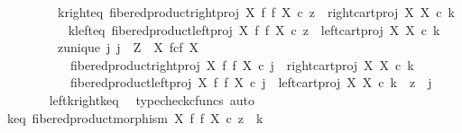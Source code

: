 \begin{isabellebody}
\ \ \ \ \ \ \ \ \ k{\isacharunderscore}{\kern0pt}right{\isacharunderscore}{\kern0pt}eq{\isacharcolon}{\kern0pt}\ {\isachardoublequoteopen}fibered{\isacharunderscore}{\kern0pt}product{\isacharunderscore}{\kern0pt}right{\isacharunderscore}{\kern0pt}proj\ X\ f\ f\ X\ {\isasymcirc}\isactrlsub c\ z\ {\isacharequal}{\kern0pt}\ right{\isacharunderscore}{\kern0pt}cart{\isacharunderscore}{\kern0pt}proj\ X\ X\ {\isasymcirc}\isactrlsub c\ k{\isachardoublequoteclose}\ \isanewline
\ \ \ \ \ \ \ \ \ k{\isacharunderscore}{\kern0pt}left{\isacharunderscore}{\kern0pt}eq{\isacharcolon}{\kern0pt}\ {\isachardoublequoteopen}fibered{\isacharunderscore}{\kern0pt}product{\isacharunderscore}{\kern0pt}left{\isacharunderscore}{\kern0pt}proj\ X\ f\ f\ X\ {\isasymcirc}\isactrlsub c\ z\ {\isacharequal}{\kern0pt}\ left{\isacharunderscore}{\kern0pt}cart{\isacharunderscore}{\kern0pt}proj\ X\ X\ {\isasymcirc}\isactrlsub c\ k{\isachardoublequoteclose}\isanewline
\ \ \ \ \ \ \ \ \ z{\isacharunderscore}{\kern0pt}unique{\isacharcolon}{\kern0pt}\ {\isachardoublequoteopen}{\isasymAnd}j{\isachardot}{\kern0pt}\ j\ {\isacharcolon}{\kern0pt}\ Z\ {\isasymrightarrow}\ X\ \isactrlbsub f\isactrlesub {\isasymtimes}\isactrlsub c\isactrlbsub f\isactrlesub \ X\ \isanewline
\ \ \ \ \ \ \ \ \ \ {\isasymand}\ fibered{\isacharunderscore}{\kern0pt}product{\isacharunderscore}{\kern0pt}right{\isacharunderscore}{\kern0pt}proj\ X\ f\ f\ X\ {\isasymcirc}\isactrlsub c\ j\ {\isacharequal}{\kern0pt}\ right{\isacharunderscore}{\kern0pt}cart{\isacharunderscore}{\kern0pt}proj\ X\ X\ {\isasymcirc}\isactrlsub c\ k\isanewline
\ \ \ \ \ \ \ \ \ \ {\isasymand}\ fibered{\isacharunderscore}{\kern0pt}product{\isacharunderscore}{\kern0pt}left{\isacharunderscore}{\kern0pt}proj\ X\ f\ f\ X\ {\isasymcirc}\isactrlsub c\ j\ {\isacharequal}{\kern0pt}\ left{\isacharunderscore}{\kern0pt}cart{\isacharunderscore}{\kern0pt}proj\ X\ X\ {\isasymcirc}\isactrlsub c\ k\ {\isasymLongrightarrow}\ z\ {\isacharequal}{\kern0pt}\ j{\isachardoublequoteclose}\isanewline
\ \ \ \ \ \ \isamarkupfalse%
\ left{\isacharunderscore}{\kern0pt}k{\isacharunderscore}{\kern0pt}right{\isacharunderscore}{\kern0pt}k{\isacharunderscore}{\kern0pt}eq\ \isamarkupfalse%
\ {\isacharparenleft}{\kern0pt}typecheck{\isacharunderscore}{\kern0pt}cfuncs{\isacharcomma}{\kern0pt}\ auto{\isacharparenright}{\kern0pt}\isanewline
\isanewline
\ \ \ \ \isamarkupfalse%
\ k{\isacharunderscore}{\kern0pt}eq{\isacharcolon}{\kern0pt}\ {\isachardoublequoteopen}fibered{\isacharunderscore}{\kern0pt}product{\isacharunderscore}{\kern0pt}morphism\ X\ f\ f\ X\ {\isasymcirc}\isactrlsub c\ z\ {\isacharequal}{\kern0pt}\ k{\isachardoublequoteclose}\isanewline

\end{isabellebody}
